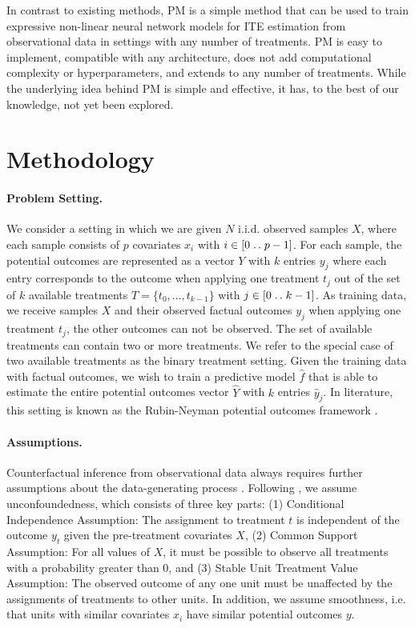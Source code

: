 \documentclass{article}
\newcommand{\isep}{\mathrel{{.}\,{.}}\nobreak}
\begin{document}
In contrast to existing methods, PM is a simple method that can be used to train expressive non-linear neural network models for ITE estimation from observational data in settings with any number of treatments. PM is easy to implement, compatible with any architecture, does not add computational complexity or hyperparameters, and extends to any number of treatments. While the underlying idea behind PM is simple and effective, it has, to the best of our knowledge, not yet been explored. 

\section{Methodology}
\paragraph{Problem Setting.} We consider a setting in which we are given $N$ i.i.d. observed samples $X$, where each sample consists of $p$ covariates $x_i$ with $i\in[0 \isep p-1]$. For each sample, the potential outcomes are represented as a vector $Y$ with $k$ entries $y_j$ where each entry corresponds to the outcome when applying one treatment $t_j$ out of the set of $k$ available treatments $T = \{t_0,..., t_{k-1}\}$ with $j\in[0 \isep k-1]$. As training data, we receive samples $X$ and their observed factual outcomes $y_j$ when applying one treatment $t_j$, the other outcomes can not be observed. The set of available treatments can contain two or more treatments. We refer to the special case of two available treatments as the binary treatment setting. Given the training data with factual outcomes, we wish to train a predictive model $\hat{f}$ that is able to estimate the entire potential outcomes vector $\hat{Y}$ with $k$ entries $\hat{y}_j$. In literature, this setting is known as the Rubin-Neyman potential outcomes framework \cite{rubin2005causal}. 

\paragraph{Assumptions.} Counterfactual inference from observational data always requires further assumptions about the data-generating process \cite{pearl2009causality,peters2017elements}. Following \cite{imbens2000role,lechner2001identification}, we assume unconfoundedness, which consists of three key parts: (1) Conditional Independence Assumption: The assignment to treatment $t$ is independent of the outcome $y_t$ given the pre-treatment covariates $X$, (2) Common Support Assumption: For all values of $X$, it must be possible to observe all treatments with a probability greater than 0, and (3) Stable Unit Treatment Value Assumption: The observed outcome of any one unit must be unaffected by the assignments of treatments to other units. In addition, we assume smoothness, i.e. that units with similar covariates $x_i$ have similar potential outcomes $y$.
\end{document}

